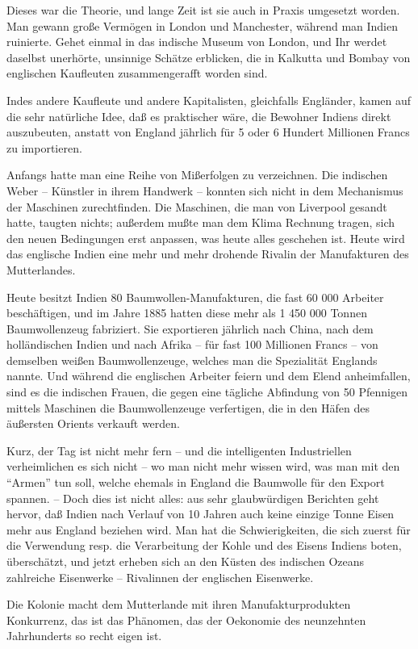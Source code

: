 \documentclass{scrbook}
\begin{document}
Dieses war die Theorie, und lange Zeit ist sie auch in Praxis umgesetzt worden. Man gewann große Vermögen in London und Manchester, während man Indien ruinierte. Gehet einmal in das indische Museum von London, und Ihr werdet daselbst unerhörte, unsinnige Schätze erblicken, die in Kalkutta und Bombay von englischen Kaufleuten zusammengerafft worden sind.

Indes andere Kaufleute und andere Kapitalisten, gleichfalls Engländer, kamen auf die sehr natürliche Idee, daß es praktischer wäre, die Bewohner Indiens direkt auszubeuten, anstatt von England jährlich für 5 oder 6 Hundert Millionen Francs zu importieren.

Anfangs hatte man eine Reihe von Mißerfolgen zu verzeichnen. Die indischen Weber – Künstler in ihrem Handwerk – konnten sich nicht in dem Mechanismus der Maschinen zurechtfinden. Die Maschinen, die man von Liverpool gesandt hatte, taugten nichts; außerdem mußte man dem Klima Rechnung tragen, sich den neuen Bedingungen erst anpassen, was heute alles geschehen ist. Heute wird das englische Indien eine mehr und mehr drohende Rivalin der Manufakturen des Mutterlandes.

Heute besitzt Indien 80 Baumwollen-Manufakturen, die fast 60 000 Arbeiter beschäftigen, und im Jahre 1885 hatten diese mehr als 1 450 000 Tonnen Baumwollenzeug fabriziert. Sie exportieren jährlich nach China, nach dem holländischen Indien und nach Afrika – für fast 100 Millionen Francs – von demselben weißen Baumwollenzeuge, welches man die Spezialität Englands nannte. Und während die englischen Arbeiter feiern und dem Elend anheimfallen, sind es die indischen Frauen, die gegen eine tägliche Abfindung von 50 Pfennigen mittels Maschinen die Baumwollenzeuge verfertigen, die in den Häfen des äußersten Orients verkauft werden.

Kurz, der Tag ist nicht mehr fern – und die intelligenten Industriellen verheimlichen es sich nicht – wo man nicht mehr wissen wird, was man mit den ``Armen'' tun soll, welche ehemals in England die Baumwolle für den Export spannen. – Doch dies ist nicht alles: aus sehr glaubwürdigen Berichten geht hervor, daß Indien nach Verlauf von 10 Jahren auch keine einzige Tonne Eisen mehr aus England beziehen wird. Man hat die Schwierigkeiten, die sich zuerst für die Verwendung resp. die Verarbeitung der Kohle und des Eisens Indiens boten, überschätzt, und jetzt erheben sich an den Küsten des indischen Ozeans zahlreiche Eisenwerke – Rivalinnen der englischen Eisenwerke.

Die Kolonie macht dem Mutterlande mit ihren Manufakturprodukten Konkurrenz, das ist das Phänomen, das der Oekonomie des neunzehnten Jahrhunderts so recht eigen ist.
\end{document}
